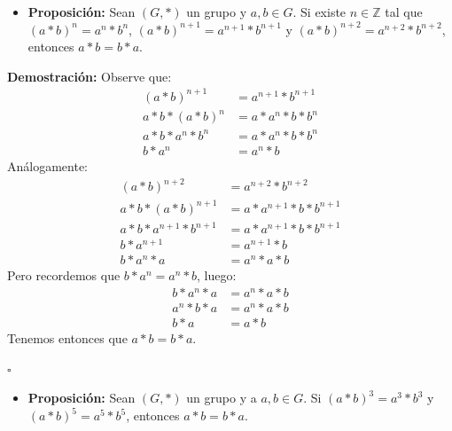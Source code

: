 \documentclass[10 pt]{article}
\begin{document}
\begin{itemize}
    \item \Large{\textbf{Proposición:} Sean $(G,*)$ un grupo y $a,b \in G$. Si existe $n \in \mathbb Z$ tal que $(a*b)^n=a^n*b^n$, $(a*b)^{n+1}=a^{n+1}*b^{n+1}$ y $(a*b)^{n+2}=a^{n+2}*b^{n+2}$, entonces $a*b=b*a$.} \\
\end{itemize}

\Large{\textbf{Demostración:} Observe que:}
\begin{align*}
    (a*b)^{n+1}&=a^{n+1}*b^{n+1} \\
    a*b*(a*b)^n&=a*a^n*b*b^n \\
    a*b*a^n*b^n&=a*a^n*b*b^n \\
    b*a^n&=a^n*b
\end{align*}
\Large{Análogamente:}
\begin{align*}
    (a*b)^{n+2}&=a^{n+2}*b^{n+2} \\
    a*b*(a*b)^{n+1}&=a*a^{n+1}*b*b^{n+1} \\
    a*b*a^{n+1}*b^{n+1}&=a*a^{n+1}*b*b^{n+1} \\
    b*a^{n+1}&=a^{n+1}*b \\
    b*a^n*a&=a^n*a*b
\end{align*}
\Large{Pero recordemos que $b*a^n=a^n*b$, luego:}
\begin{align*}
    b*a^n*a&=a^n*a*b \\
    a^n*b*a&=a^n*a*b \\
    b*a&=a*b
\end{align*}
\Large{Tenemos entonces que $a*b=b*a$.} \\

\begin{flushright}
    $\square$
\end{flushright}

\begin{itemize}
    \item \Large{\textbf{Proposición:} Sean $(G,*)$ un grupo y a $a,b \in G$. Si $(a*b)^3=a^3*b^3$ y $(a*b)^5=a^5*b^5$, entonces $a*b=b*a$.} \\
\end{itemize}
\end{document}
